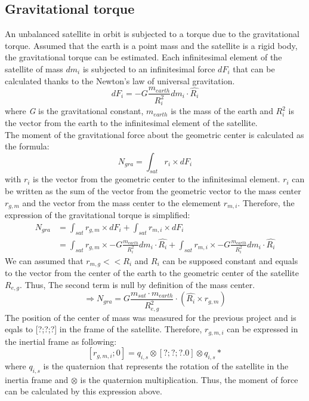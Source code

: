 \subsection{Gravitational torque}
An unbalanced satellite in orbit is subjected to a torque due to the gravitational torque. Assumed that the earth is a point mass and the satellite is a rigid body, the gravitational torque can be estimated. Each infinitesimal element of the satellite of mass \textit{$dm_i$} is subjected to an infinitesimal force \textit{$dF_i$} that can be calculated thanks to the Newton's law of universal gravitation.
\[
dF_i = -G\frac{m_{earth}}{R_i^2}dm_i \cdot \hat{R_i}
\]
where \textit{G} is the gravitational constant, \textit{$m_{earth}$} is the mass of the earth and \textit{$R_i^2$} is the vector from the earth to the infinitesimal element of the satellite. \\
The moment of the gravitational force about the geometric center is calculated as the formula:
\[
N_{gra} = \int_{sat} r_i \times dF_i 
\]
with $r_i$ is the vector from the geometric center to the infinitesimal element. $r_i$ can be written as the sum of the vector from the geometric vector to the mass center $r_{g,m}$ and the vector from the mass center to the elemement $r_{m,i}$. Therefore, the expression of the gravitational torque is simplified:
\begin{align*}
	N_{gra} &= \int_{sat} r_{g,m} \times dF_i + \int_{sat} r_{m,i} \times dF_i \\
	&= \int_{sat} r_{g,m} \times -G\frac{m_{earth}}{R_i^2}dm_i \cdot \hat{R_i} + \int_{sat} r_{m,i} \times -G\frac{m_{earth}}{R_i^2}dm_i \cdot \hat{R_i}
\end{align*}
We can assumed that $r_{m,g} << R_i$ and $R_i$ can be supposed constant and equals to the vector from the center of the earth to the geometric center of the satellite $R_{e,g}$. Thus, The second term is null by definition of the mass center.
\[
\Rightarrow N_{gra} = G\frac{m_{sat} \cdot m_{earth}}{R_{e,g}^2} \cdot (\hat{R_i} \times r_{g,m})
\]
The position of the center of mass was measured for the previous project and is eqals to [?;?;?] in the frame of the satellite. Therefore, $r_{g,m,i}$ can be expressed in the inertial frame as following:
\[
[r_{g,m,i};0] = q_{i,s} \otimes [?;?;?.0] \otimes q_{i,s}*
\]
where $q_{i,s}$ is the quaternion that represents the rotation of the satellite in the inertia frame and $\otimes$ is the quaternion multiplication. Thus, the moment of force can be calculated by this expression above.
